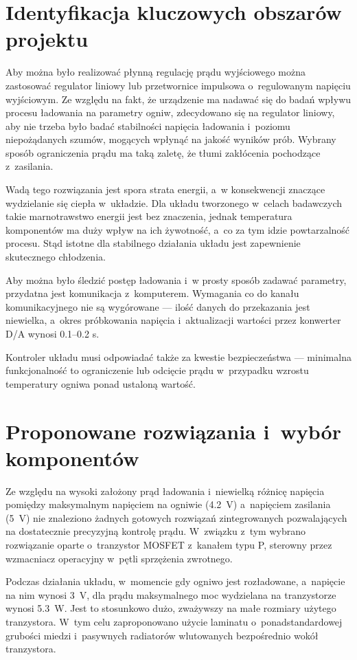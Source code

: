 \documentclass[polish,engineer]{polsl-msth}
\begin{document}
\section{Identyfikacja kluczowych obszarów projektu}
Aby można było realizować płynną regulację prądu wyjściowego można zastosować regulator liniowy lub przetwornice impulsowa o~regulowanym napięciu wyjściowym. Ze względu na fakt, że urządzenie ma nadawać się do badań wpływu procesu ładowania na parametry ogniw, zdecydowano się na regulator liniowy, aby nie trzeba było badać stabilności napięcia ładowania i~poziomu niepożądanych szumów, mogących wpłynąć na jakość wyników prób. Wybrany sposób ograniczenia prądu ma taką zaletę, że tłumi zakłócenia pochodzące z~zasilania.

Wadą tego rozwiązania jest spora strata energii, a~w konsekwencji znaczące wydzielanie się ciepła w~układzie. Dla układu tworzonego w~celach badawczych takie marnotrawstwo energii jest bez znaczenia, jednak temperatura komponentów ma duży wpływ na ich żywotność, a~co za tym idzie powtarzalność procesu. Stąd istotne dla stabilnego działania układu jest zapewnienie skutecznego chłodzenia.

Aby można było śledzić postęp ładowania i~w prosty sposób zadawać parametry, przydatna jest komunikacja z~komputerem. Wymagania co do kanału komunikacyjnego nie są wygórowane --- ilość danych do przekazania jest niewielka, a~okres próbkowania napięcia i~aktualizacji wartości przez konwerter D/A wynosi 0.1--0.2 s.

Kontroler układu musi odpowiadać także za kwestie bezpieczeństwa --- minimalna funkcjonalność to ograniczenie lub odcięcie prądu w~przypadku wzrostu temperatury ogniwa ponad ustaloną wartość.

\section{Proponowane rozwiązania i~wybór komponentów}
Ze względu na wysoki założony prąd ładowania i~niewielką różnicę napięcia pomiędzy maksymalnym napięciem na ogniwie (4.2~V) a~napięciem zasilania (5~V) nie znaleziono żadnych gotowych rozwiązań zintegrowanych pozwalających na dostatecznie precyzyjną kontrolę prądu. W~związku z~tym wybrano rozwiązanie oparte o~tranzystor MOSFET z~kanałem typu P, sterowny przez wzmacniacz operacyjny w~pętli sprzężenia zwrotnego.

Podczas działania układu, w~momencie gdy ogniwo jest rozładowane, a~napięcie na nim wynosi 3~V, dla prądu maksymalnego moc wydzielana na tranzystorze wynosi 5.3~W. Jest to stosunkowo dużo, zważywszy na małe rozmiary użytego tranzystora. W~tym celu zaproponowano użycie laminatu o~ponadstandardowej grubości miedzi i~pasywnych radiatorów wlutowanych bezpośrednio wokół tranzystora.
\end{document}
